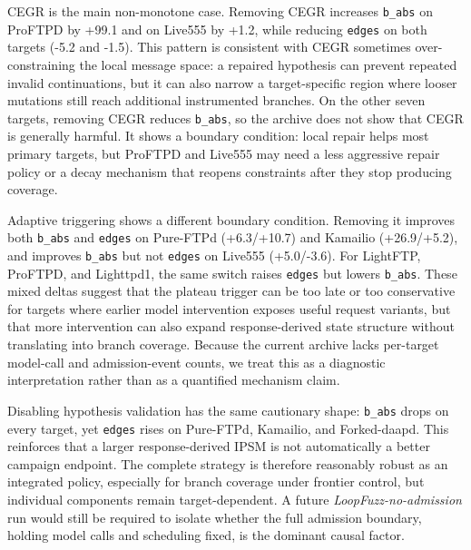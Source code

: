 \documentclass[final,5p,times,number]{elsarticle}
\begin{document}
CEGR is the main non-monotone case. Removing CEGR increases \texttt{b\_abs} on ProFTPD by +99.1 and on Live555 by +1.2, while reducing \texttt{edges} on both targets (-5.2 and -1.5). This pattern is consistent with CEGR sometimes over-constraining the local message space: a repaired hypothesis can prevent repeated invalid continuations, but it can also narrow a target-specific region where looser mutations still reach additional instrumented branches. On the other seven targets, removing CEGR reduces \texttt{b\_abs}, so the archive does not show that CEGR is generally harmful. It shows a boundary condition: local repair helps most primary targets, but ProFTPD and Live555 may need a less aggressive repair policy or a decay mechanism that reopens constraints after they stop producing coverage.

Adaptive triggering shows a different boundary condition. Removing it improves both \texttt{b\_abs} and \texttt{edges} on Pure-FTPd (+6.3/+10.7) and Kamailio (+26.9/+5.2), and improves \texttt{b\_abs} but not \texttt{edges} on Live555 (+5.0/-3.6). For LightFTP, ProFTPD, and Lighttpd1, the same switch raises \texttt{edges} but lowers \texttt{b\_abs}. These mixed deltas suggest that the plateau trigger can be too late or too conservative for targets where earlier model intervention exposes useful request variants, but that more intervention can also expand response-derived state structure without translating into branch coverage. Because the current archive lacks per-target model-call and admission-event counts, we treat this as a diagnostic interpretation rather than as a quantified mechanism claim.

Disabling hypothesis validation has the same cautionary shape: \texttt{b\_abs} drops on every target, yet \texttt{edges} rises on Pure-FTPd, Kamailio, and Forked-daapd. This reinforces that a larger response-derived IPSM is not automatically a better campaign endpoint. The complete strategy is therefore reasonably robust as an integrated policy, especially for branch coverage under frontier control, but individual components remain target-dependent. A future \emph{LoopFuzz-no-admission} run would still be required to isolate whether the full admission boundary, holding model calls and scheduling fixed, is the dominant causal factor.
\end{document}
